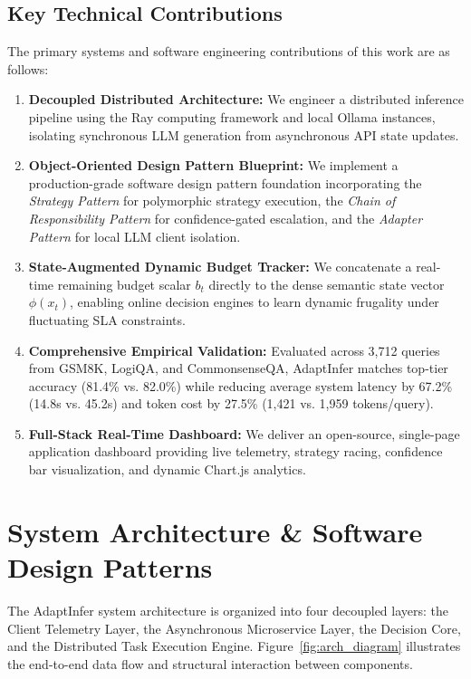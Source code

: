 \documentclass[pdflatex,sn-mathphys-num]{sn-jnl}%
\theoremstyle{thmstyleone}%
\theoremstyle{thmstyletwo}%
\theoremstyle{thmstylethree}%
\begin{document}
\subsection{Key Technical Contributions}
The primary systems and software engineering contributions of this work are as follows:
\begin{enumerate}
    \item \textbf{Decoupled Distributed Architecture:} We engineer a distributed inference pipeline using the Ray computing framework and local Ollama instances, isolating synchronous LLM generation from asynchronous API state updates.
    \item \textbf{Object-Oriented Design Pattern Blueprint:} We implement a production-grade software design pattern foundation incorporating the \textit{Strategy Pattern} for polymorphic strategy execution, the \textit{Chain of Responsibility Pattern} for confidence-gated escalation, and the \textit{Adapter Pattern} for local LLM client isolation.
    \item \textbf{State-Augmented Dynamic Budget Tracker:} We concatenate a real-time remaining budget scalar $b_t$ directly to the dense semantic state vector $\phi(x_t)$, enabling online decision engines to learn dynamic frugality under fluctuating SLA constraints.
    \item \textbf{Comprehensive Empirical Validation:} Evaluated across 3,712 queries from GSM8K, LogiQA, and CommonsenseQA, AdaptInfer matches top-tier accuracy (81.4\% vs. 82.0\%) while reducing average system latency by 67.2\% (14.8s vs. 45.2s) and token cost by 27.5\% (1,421 vs. 1,959 tokens/query).
    \item \textbf{Full-Stack Real-Time Dashboard:} We deliver an open-source, single-page application dashboard providing live telemetry, strategy racing, confidence bar visualization, and dynamic Chart.js analytics.
\end{enumerate}

\section{System Architecture \& Software Design Patterns}\label{sec2}

The AdaptInfer system architecture is organized into four decoupled layers: the Client Telemetry Layer, the Asynchronous Microservice Layer, the Decision Core, and the Distributed Task Execution Engine. Figure~\ref{fig:arch_diagram} illustrates the end-to-end data flow and structural interaction between components.
\end{document}
